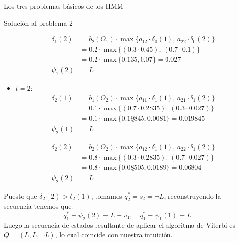 \begin{section}{Los tres problemas básicos de los HMM}
\begin{subsection}{Solución al problema 2}
\begin{exampleth}
\begin{itemize}
    \[\begin{aligned}
        \delta_1(2)&=b_2(O_1)\cdot\max\{a_{12}\cdot\delta_0(1),\,a_{22}\cdot\delta_0(2)\}\\
        &=0.2\cdot\max\{(0.3\cdot0.45),\,(0.7\cdot0.1)\}\\
        &=0.2\cdot\max\{\underline{0.135},0.07\}=0.027\\
        \psi_1(2)&=L
    \end{aligned}\]
    
    \item $t=2$:
    \[\begin{aligned}
        \delta_2(1)&=b_1(O_2)\cdot\max\{a_{11}\cdot\delta_1(1),\,a_{21}\cdot\delta_1(2)\}\\
        &=0.1\cdot\max\{(0.7\cdot0.2835),\,(0.3\cdot0.027)\}\\
        &=0.1\cdot\max\{\underline{0.19845},0.0081\}=0.019845\\
        \psi_2(1)&=L
    \end{aligned}\]
    
    \[\begin{aligned}
        \delta_2(2)&=b_2(O_2)\cdot\max\{a_{12}\cdot\delta_1(1),\,a_{22}\cdot\delta_1(2)\}\\
        &=0.8\cdot\max\{(0.3\cdot0.2835),\,(0.7\cdot0.027)\}\\
        &=0.8\cdot\max\{\underline{0.08505},0.0189\}=0.06804\\
        \psi_2(2)&=L
    \end{aligned}\]
\end{itemize}
Puesto que $\delta_2(2)>\delta_2(1)$, tomamos $q_2^*=s_2=\neg L$, reconstruyendo la secuencia tenemos que:
\[q_1^*=\psi_2(2)=L=s_1, \quad q_0^*=\psi_1(1)=L\]
Luego la secuencia de estados resultante de aplicar el algoritmo de Viterbi es $Q=(L,L,\neg L)$, lo cual coincide con nuestra intuición.

\end{exampleth}


\end{subsection}
\end{section}
